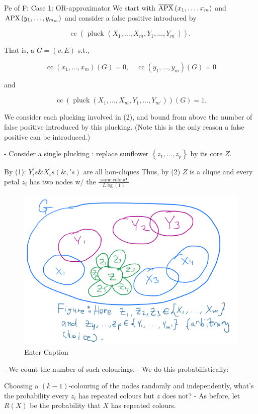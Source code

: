 Pe of F: Case 1: OR-approximator
We start with $\overline{\mathrm{APX}}\left(x_1, \ldots, x_m\right)$ and $\operatorname{\mathrm{APX}}\left(y_1, \ldots, y_{m_m}\right)$ and consider a false positive introduced by

$$
\operatorname{cc}\left(\text { pluck }\left(X_1, \ldots, X_m, Y_1, \ldots, Y_{m^{\prime}}\right)\right) \text {. }
$$


That is, a $G=(v, E)$ s.t.,

$$
\operatorname{cc}\left(x_1, \ldots, x_m\right)(G)=0, \quad \operatorname{cc}\left(y_1, \ldots, y_m\right)(G)=0
$$

and

$$
\operatorname{cc}\left(\operatorname{pluck}\left(X_1, \ldots, X_m, Y_1, \ldots, Y_{m^{\prime}}\right)\right)(G)=1 .
$$


We consider each plucking involved in (2), and bound from above the number of false positive introduced by this plucking. (Note this is the only reason a false positive can be introduced.)


 - Consider a single plucking : replace sunflower $\left\{z_1, \ldots, z_p\right\}$ by its core $Z$.

By (1): $Y_i^{\prime} s \& X_i^{\prime} s(\&, ' s)$
are all hon-cliques
Thus, by (2)
$Z$ is a clique
and every petal $z_i$
has two nodes w/ the $\frac{\text { same colour! }}{L \operatorname{bg}(1)}$



\begin{figure}[H]
    \centering
    \includegraphics[width=.6\linewidth]{images/clique3.png}
    \caption{Enter Caption}
    \label{fig:enter-label}
\end{figure}


- We count the number of such colourings.
- We do this probabilistically:

Choosing a $(k-1)$-colouring of the nodes randomly and independently, what's the probability every $z_i$ has repeated colours but $z$ does not?
- As before, let $R(X)$ be the probability that $X$ has repeated colours.


